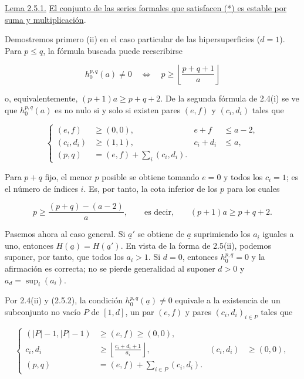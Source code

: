 \medskip
\noindent\underline{Lema 2.5.1.}\quad
\underline{El conjunto de las series formales que satisfacen (*) es
estable por suma y multiplicación}.

Demostremos primero (ii) en el caso particular de las hipersuperficies
($d=1$). Para $p\leq q$, la fórmula buscada puede reescribirse

\begin{equation}\tag{2.5.2}
h_0^{p,q}(a)\ne0
\quad\Longleftrightarrow\quad
p\geq\left\lfloor\frac{p+q+1}{a}\right\rfloor
\end{equation}

o, equivalentemente, $(p+1)a\geq p+q+2$. De la segunda fórmula de 2.4(i)
se ve que $h_0^{p,q}(a)$ es no nulo si y solo si existen pares $(e,f)$ y
$(c_i,d_i)$ tales que

\begin{equation}\tag{2.5.3}
\left\{
\begin{aligned}
(e,f)&\geq(0,0),& e+f&\leq a-2,\\
(c_i,d_i)&\geq(1,1),& c_i+d_i&\leq a,\\
(p,q)&=(e,f)+\sum_i(c_i,d_i).&&
\end{aligned}
\right.
\end{equation}

\pageoriginale

Para $p+q$ fijo, el menor $p$ posible se obtiene tomando $e=0$ y todos los
$c_i=1$; es el número de índices $i$. Es, por tanto, la cota inferior de
los $p$ para los cuales

\begin{equation*}
p\geq\frac{(p+q)-(a-2)}{a},
\qquad\text{es decir,}\qquad (p+1)a\geq p+q+2.
\end{equation*}

Pasemos ahora al caso general. Si $\underline a'$ se obtiene de
$\underline a$ suprimiendo los $a_i$ iguales a uno, entonces
$H(\underline a)=H(\underline a')$. En vista de la forma de 2.5(ii),
podemos suponer, por tanto, que todos los $a_i>1$. Si $d=0$, entonces
$h_0^{p,q}=0$ y la afirmación es correcta; no se pierde generalidad al
suponer $d>0$ y $a_d=\sup_i(a_i)$.

Por 2.4(ii) y (2.5.2), la condición
$h_0^{p,q}(\underline a)\ne0$ equivale a la existencia de un subconjunto no
vacío $P$ de $[1,d]$, un par $(e,f)$ y pares
$(c_i,d_i)_{i\in P}$ tales que

\begin{equation}\tag{2.5.4}
\left\{
\begin{aligned}
(|P|-1,|P|-1)&\geq(e,f)\geq(0,0),\\
c_i,d_i&\geq
\left\lfloor\frac{c_i+d_i+1}{a_i}\right\rfloor,
& (c_i,d_i)&\geq(0,0),\\
(p,q)&=(e,f)+\sum_{i\in P}(c_i,d_i).&&
\end{aligned}
\right.
\end{equation}

